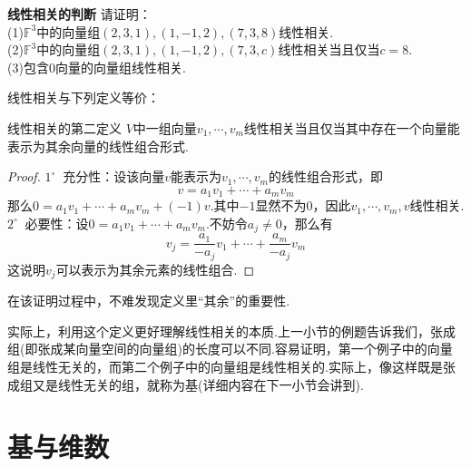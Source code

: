 \documentclass[lang=cn, zihao=5]{elegantbook}
\newcommand{\F}{\mathbb{F}}
\newcommand{\buzhou}[1]{$#1^{\circ} \ $}
\newcommand{\examplefont}[1]{\color{mgreen} \textbf{#1}}
\begin{document}
\begin{example}{\examplefont{线性相关的判断}}
	请证明： \\
	(1)$\F ^{3}$中的向量组$(2,3,1),(1,-1,2),(7,3,8)$线性相关. \\
	(2)$\F ^{3}$中的向量组$(2,3,1),(1,-1,2),(7,3,c)$线性相关当且仅当$c=8$. \\
	(3)包含$0$向量的向量组线性相关.
\end{example}

线性相关与下列定义等价：

\begin{proposition}{线性相关的第二定义}
	$V$中一组向量$v_1, \cdots ,v_m$线性相关当且仅当其中存在一个向量能表示为其余向量的线性组合形式.
\end{proposition}
\begin{proof}
	\buzhou{1} 充分性：设该向量$v$能表示为$v_1, \cdots ,v_m$的线性组合形式，即$$v= a_1v_1 + \cdots + a_mv_m$$
	那么$0=a_1v_1 + \cdots + a_mv_m + (-1)v$.其中$-1$显然不为$0$，因此$v_1, \cdots ,v_m,v$线性相关. \\
	\buzhou{2} 必要性：设$0=a_1v_1 + \cdots + a_mv_m$.不妨令$a_j \neq 0$，那么有$$v_j = \frac{a_1}{-a_j} v_1 + \cdots + \frac{a_m}{-a_j} v_m$$
	这说明$v_j$可以表示为其余元素的线性组合.
\end{proof}
\begin{remark}
	在该证明过程中，不难发现定义里“其余”的重要性.
\end{remark}

实际上，利用这个定义更好理解线性相关的本质.上一小节的例题告诉我们，张成组(即张成某向量空间的向量组)的长度可以不同.容易证明，第一个例子中的向量组是线性无关的，而第二个例子中的向量组是线性相关的.实际上，像这样既是张成组又是线性无关的组，就称为基(详细内容在下一小节会讲到).




\newpage
\section{基与维数}
\end{document}
